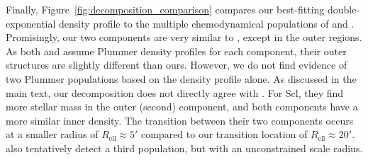 \documentclass[linenumbers, twocolumn, twocolappendix]{aastex701}
\makeatletter
\DeclareRobustCommand\citepos
  {\begingroup
   \let\NAT@nmfmt\NAT@posfmt%
   \NAT@swafalse\let\NAT@ctype\z@\NAT@partrue
   \@ifstar{\NAT@fulltrue\NAT@citetp}{\NAT@fullfalse\NAT@citetp}}
\let\NAT@orig@nmfmt\NAT@nmfmt
\def\NAT@posfmt#1{\NAT@orig@nmfmt{#1's}}
\makeatother
\begin{document}
Finally, Figure~\ref{fig:decomposition_comparison} compares our best-fitting double-exponential density profile to the multiple chemodynamical populations of \citet{arroyo-polonio+2024} and \citet{pace+2020}. Promisingly, our two components are very similar to \citet{pace+2020}, except in the outer regions. As both \citet{arroyo-polonio+2024} and \citet{pace+2020} assume Plummer density profiles for each component, their outer structures are slightly different than ours. However, we do not find evidence of two Plummer populations based on the density profile alone.
As discussed in the main text, our decomposition does not directly agree with \citepos{arroyo-polonio+2024}. For Scl, they find more stellar mass in the outer (second) component, and both components have a more similar inner density. The transition between their two components occurs at a smaller radius of $R_\text{ell} \approx 5'$  compared to our transition location of $R_\text{ell} \approx 20'$. \citet{arroyo-polonio+2024} also tentatively detect a third population, but with an unconstrained scale radius.
\end{document}
